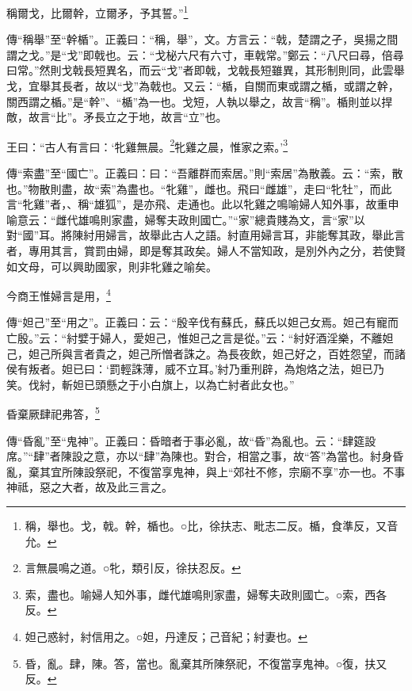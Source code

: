 稱爾戈，比爾幹，立爾矛，予其誓。”\footnote{稱，舉也。戈，戟。幹，楯也。○比，徐扶志、毗志二反。楯，食準反，又音允。}

{\noindent\zhuan{}\fzbyks 傳“稱舉”至“幹楯”。正義曰：“稱，舉”，文。方言云：“戟，楚謂之孑，吳揚之間謂之戈。”是“戈”即戟也。云：“戈柲六尺有六寸，車戟常。”鄭云：“八尺曰尋，倍尋曰常。”然則戈戟長短異名，而云“戈”者即戟，戈戟長短雖異，其形制則同，此雲舉戈，宜舉其長者，故以“戈”為戟也。又云：“楯，自關而東或謂之楯，或謂之幹，關西謂之楯。”是“幹”、“楯”為一也。戈短，人執以舉之，故言“稱”。楯則並以捍敵，故言“比”。矛長立之于地，故言“立”也。 \par}

王曰：“古人有言曰：‘牝雞無晨。\footnote{言無晨鳴之道。○牝，類引反，徐扶忍反。}牝雞之晨，惟家之索。’\footnote{索，盡也。喻婦人知外事，雌代雄鳴則家盡，婦奪夫政則國亡。○索，西各反。}

{\noindent\zhuan{}\fzbyks 傳“索盡”至“國亡”。正義曰：曰：“吾離群而索居。”則“索居”為散義。云：“索，散也。”物散則盡，故“索”為盡也。“牝雞”，雌也。飛曰“雌雄”，走曰“牝牡”，而此言“牝雞”者，、稱“雄狐”，是亦飛、走通也。此以牝雞之鳴喻婦人知外事，故重申喻意云：“雌代雄鳴則家盡，婦奪夫政則國亡。”“家”總貴賤為文，言“家”以對“國”耳。將陳紂用婦言，故舉此古人之語。紂直用婦言耳，非能奪其政，舉此言者，專用其言，賞罰由婦，即是奪其政矣。婦人不當知政，是別外內之分，若使賢如文母，可以興助國家，則非牝雞之喻矣。 \par}

今商王惟婦言是用，\footnote{妲己惑紂，紂信用之。○妲，丹達反；己音紀；紂妻也。}

{\noindent\zhuan{}\fzbyks 傳“妲己”至“用之”。正義曰：云：“殷辛伐有蘇氏，蘇氏以妲己女焉。妲己有寵而亡殷。”云：“紂嬖于婦人，愛妲己，惟妲己之言是從。”云：“紂好酒淫樂，不離妲己，妲己所與言者貴之，妲己所憎者誅之。為長夜飲，妲己好之，百姓怨望，而諸侯有叛者。妲已曰：‘罰輕誅薄，威不立耳。’紂乃重刑辟，為炮烙之法，妲已乃笑。伐紂，斬妲已頭懸之于小白旗上，以為亡紂者此女也。” \par}

昏棄厥肆祀弗答，\footnote{昏，亂。肆，陳。答，當也。亂棄其所陳祭祀，不復當享鬼神。○復，扶又反。}

{\noindent\zhuan{}\fzbyks 傳“昏亂”至“鬼神”。正義曰：昏暗者于事必亂，故“昏”為亂也。云：“肆筵設席。”“肆”者陳設之意，亦以“肆”為陳也。對合，相當之事，故“答”為當也。紂身昏亂，棄其宜所陳設祭祀，不復當享鬼神，與上“郊社不修，宗廟不享”亦一也。不事神祗，惡之大者，故及此三言之。 \par}

